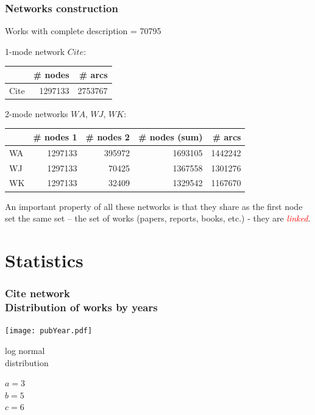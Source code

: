 \documentclass[hyperref={pdfstartview={FitBH -32768},
                         pdfpagemode=FullScreen,
                         plainpages=false,
                         colorlinks=true}
              ]{beamer}
\newcommand{\keyw}[1]{\textcolor{red}{\emph{#1}}}
\begin{document}
\begin{frame}[fragile]
\frametitle{Networks construction}
\small 

Works with complete description = 70795 \medskip

1-mode network $Cite$: \medskip

\begin{center}
\begin{tabular}{l|r|r|}
 	& \# nodes & \# arcs \\ \hline		
Cite	& 1297133	& 2753767	\\ \hline
\end{tabular}
\end{center}
\bigskip

2-mode networks $WA$, $WJ$, $WK$:  \medskip 

\begin{tabular}{l|r|r|r|r|}
	&\# nodes 1	& \# nodes 2	&\# nodes (sum)	& \# arcs \\ \hline		 
WA	& 1297133	          & 395972	          & 1693105	           & 1442242 \\ 
WJ	& 1297133	          & 70425	          & 1367558	           & 1301276 \\ 
WK 	& 1297133	          & 32409	          & 1329542	           & 1167670 \\  \hline 
\end{tabular}\bigskip				

An important property of all these networks is that they share as the first node set the same set – the set of works (papers, reports, books, etc.) - they are \keyw{linked}.

\end{frame}

\section{Statistics}


\begin{frame}[fragile]
\frametitle{Cite network\label{maxinc}\\ \normalsize Distribution of works by years}
\begin{center}
\parbox{75mm}{\texttt{[image: pubYear.pdf]}}
\parbox{25mm}{\footnotesize log normal \\ distribution

$a = 3$\\
$b = 5$\\
$c = 6$}
\end{center}
\end{frame}
\end{document}
